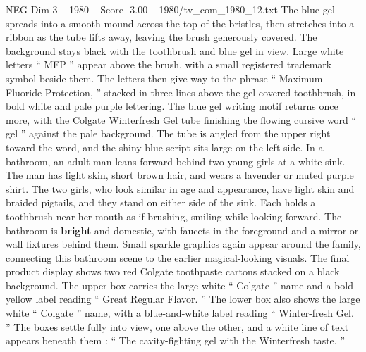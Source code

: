 \begin{textsample}{NEG Dim 3 – 1980 – Score -3.00 – 1980/tv\_com\_1980\_12.txt}
The blue gel spreads into a smooth mound across the top of the bristles, then stretches into a ribbon as the tube lifts away, leaving the brush generously covered.
The background stays black with the toothbrush and blue gel in view.
Large white letters “ MFP ” appear above the brush, with a small registered trademark symbol beside them.
The letters then give way to the phrase “ Maximum Fluoride Protection, ” stacked in three lines above the gel-covered toothbrush, in bold white and pale purple lettering.
The blue gel writing motif returns once more, with the Colgate Winterfresh Gel tube finishing the flowing cursive word “ gel ” against the pale background.
The tube is angled from the upper right toward the word, and the shiny blue script sits large on the left side.
In a bathroom, an adult man leans forward behind two young girls at a white sink.
The man has light skin, short brown hair, and wears a lavender or muted purple shirt.
The two girls, who look similar in age and appearance, have light skin and braided pigtails, and they stand on either side of the sink.
Each holds a toothbrush near her mouth as if brushing, smiling while looking forward.
The bathroom is \textbf{bright} and domestic, with faucets in the foreground and a mirror or wall fixtures behind them.
Small sparkle graphics again appear around the family, connecting this bathroom scene to the earlier magical-looking visuals.
The final product display shows two red Colgate toothpaste cartons stacked on a black background.
The upper box carries the large white “ Colgate ” name and a bold yellow label reading “ Great Regular Flavor. ” The lower box also shows the large white “ Colgate ” name, with a blue-and-white label reading “ Winter-fresh Gel. ” The boxes settle fully into view, one above the other, and a white line of text appears beneath them : “ The cavity-fighting gel with the Winterfresh taste. ”

\end{textsample}
